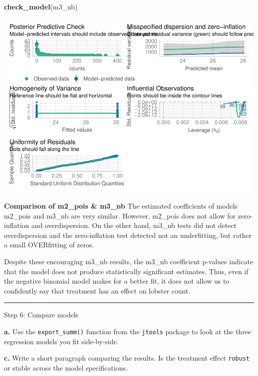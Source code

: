 \documentclass[
]{article}
\newenvironment{Shaded}{\begin{snugshade}}{\end{snugshade}}
\newcommand{\FunctionTok}[1]{\textcolor[rgb]{0.13,0.29,0.53}{\textbf{#1}}}
\newcommand{\NormalTok}[1]{#1}
\begin{document}
\begin{Shaded}
\begin{Highlighting}[]
\FunctionTok{check\_model}\NormalTok{(m3\_nb)}
\end{Highlighting}
\end{Shaded}

\includegraphics{hw1-lobstrs-eds241_files/figure-latex/unnamed-chunk-28-1.pdf}

\textbf{Comparison of m2\_pois \& m3\_nb} The estimated coefficients of
models m2\_pois and m3\_nb are very similar. However, m2\_pois does not
allow for zero-inflation and overdispersion. On the other hand, m3\_nb
tests did not detect overdispersion and the zero-inflation test detected
not an underfitting, but rather a small OVERfitting of zeros.

Despite these encouraging m3\_nb results, the m3\_nb coefficient
p-values indicate that the model does not produce statistically
significant estimates. Thus, even if the negative binomial model makes
for a better fit, it does not allow us to confidently say that treatment
has an effect on lobster count.

\begin{center}\rule{0.5\linewidth}{0.5pt}\end{center}

Step 6: Compare models

\textbf{a.} Use the \texttt{export\_summ()} function from the
\texttt{jtools} package to look at the three regression models you fit
side-by-side.

\textbf{c.} Write a short paragraph comparing the results. Is the
treatment effect \texttt{robust} or stable across the model
specifications.
\end{document}
